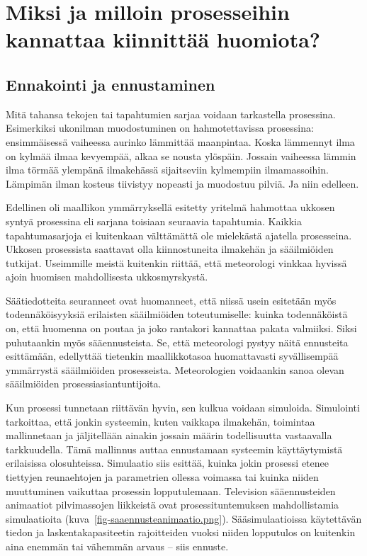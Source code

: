 \documentclass[
  finnish,
  letterpaper,
  DIV=11,
  numbers=noendperiod,
  oneside]{scrreprt}
\begin{document}
\section{Miksi ja milloin prosesseihin kannattaa kiinnittää
huomiota?}\label{miksi-ja-milloin-prosesseihin-kannattaa-kiinnittuxe4uxe4-huomiota}

\subsection{Ennakointi ja
ennustaminen}\label{ennakointi-ja-ennustaminen}

Mitä tahansa tekojen tai tapahtumien sarjaa voidaan tarkastella
prosessina. Esimerkiksi ukonilman muodostuminen on hahmotettavissa
prosessina: ensimmäisessä vaiheessa aurinko lämmittää maanpintaa. Koska
lämmennyt ilma on kylmää ilmaa kevyempää, alkaa se nousta ylöspäin.
Jossain vaiheessa lämmin ilma törmää ylempänä ilmakehässä sijaitseviin
kylmempiin ilmamassoihin. Lämpimän ilman kosteus tiivistyy nopeasti ja
muodostuu pilviä. Ja niin edelleen.

Edellinen oli maallikon ymmärryksellä esitetty yritelmä hahmottaa
ukkosen syntyä prosessina eli sarjana toisiaan seuraavia tapahtumia.
Kaikkia tapahtumasarjoja ei kuitenkaan välttämättä ole mielekästä
ajatella prosesseina. Ukkosen prosessista saattavat olla kiinnostuneita
ilmakehän ja sääilmiöiden tutkijat. Useimmille meistä kuitenkin riittää,
että meteorologi vinkkaa hyvissä ajoin huomisen mahdollisesta
ukkosmyrskystä.

Säätiedotteita seuranneet ovat huomanneet, että niissä usein esitetään
myös todennäköisyyksiä erilaisten sääilmiöiden toteutumiselle: kuinka
todennäköistä on, että huomenna on poutaa ja joko rantakori kannattaa
pakata valmiiksi. Siksi puhutaankin myös sääennusteista. Se, että
meteorologi pystyy näitä ennusteita esittämään, edellyttää tietenkin
maallikkotasoa huomattavasti syvällisempää ymmärrystä sääilmiöiden
prosesseista. Meteorologien voidaankin sanoa olevan sääilmiöiden
prosessiasiantuntijoita.

Kun prosessi tunnetaan riittävän hyvin, sen kulkua voidaan simuloida.
Simulointi tarkoittaa, että jonkin systeemin, kuten vaikkapa ilmakehän,
toimintaa mallinnetaan ja jäljitellään ainakin jossain määrin
todellisuutta vastaavalla tarkkuudella. Tämä mallinnus auttaa
ennustamaan systeemin käyttäytymistä erilaisissa olosuhteissa.
Simulaatio siis esittää, kuinka jokin prosessi etenee tiettyjen
reunaehtojen ja parametrien ollessa voimassa tai kuinka niiden
muuttuminen vaikuttaa prosessin lopputulemaan. Television sääennusteiden
animaatiot pilvimassojen liikkeistä ovat prosessituntemuksen
mahdollistamia simulaatioita (kuva~\ref{fig-saaennusteanimaatio.png}).
Sääsimulaatioissa käytettävän tiedon ja laskentakapasiteetin
rajoitteiden vuoksi niiden lopputulos on kuitenkin aina enemmän tai
vähemmän arvaus -- siis ennuste.
\end{document}
